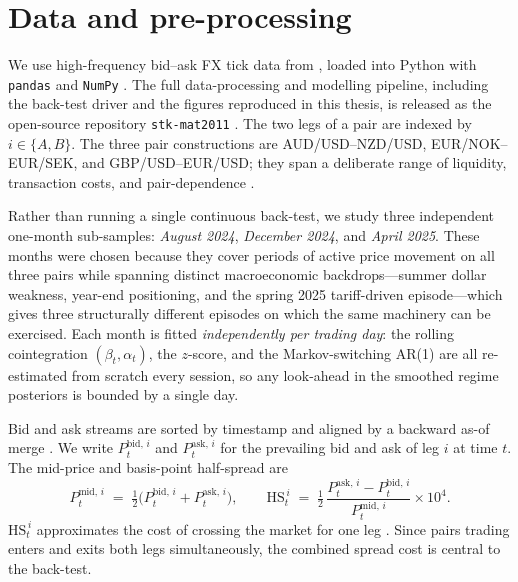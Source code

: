 
\section{Data and pre-processing}\label{sec:data}

We use high-frequency bid--ask FX tick data from \textcite{dukascopy}, loaded into Python with \texttt{pandas} \parencite{mckinney2010pandas} and \texttt{NumPy} \parencite{harris2020numpy}. The full data-processing and modelling pipeline, including the back-test driver and the figures reproduced in this thesis, is released as the open-source repository \texttt{stk-mat2011} \parencite{furnes2026repo}. The two legs of a pair are indexed by $i \in \{A, B\}$. The three pair constructions are AUD/USD--NZD/USD, EUR/NOK--EUR/SEK, and GBP/USD--EUR/USD; they span a deliberate range of liquidity, transaction costs, and pair-dependence \parencite{gatev2006pairs,krauss2017statarb}.

Rather than running a single continuous back-test, we study three independent one-month sub-samples: \emph{August 2024}, \emph{December 2024}, and \emph{April 2025}. These months were chosen because they cover periods of active price movement on all three pairs while spanning distinct macroeconomic backdrops---summer dollar weakness, year-end positioning, and the spring 2025 tariff-driven episode---which gives three structurally different episodes on which the same machinery can be exercised. Each month is fitted \emph{independently per trading day}: the rolling cointegration $(\beta_t,\alpha_t)$, the $z$-score, and the Markov-switching AR(1) are all re-estimated from scratch every session, so any look-ahead in the smoothed regime posteriors is bounded by a single day.

Bid and ask streams are sorted by timestamp and aligned by a backward as-of merge \parencite{hasbrouck2007microstructure}. We write $P_t^{\mathrm{bid},\,i}$ and $P_t^{\mathrm{ask},\,i}$ for the prevailing bid and ask of leg $i$ at time $t$. The mid-price and basis-point half-spread are
\begin{equation}\label{eq:midprice}
    P_t^{\mathrm{mid},\,i} \;=\; \tfrac{1}{2}\bigl(P_t^{\mathrm{bid},\,i} + P_t^{\mathrm{ask},\,i}\bigr),
    \qquad
    \mathrm{HS}_t^{\,i} \;=\; \tfrac{1}{2}\,\frac{P_t^{\mathrm{ask},\,i} - P_t^{\mathrm{bid},\,i}}{P_t^{\mathrm{mid},\,i}}\times 10^{4}.
\end{equation}
$\mathrm{HS}_t^{\,i}$ approximates the cost of crossing the market for one leg \parencite{roll1984spread}. Since pairs trading enters and exits both legs simultaneously, the combined spread cost is central to the back-test.

